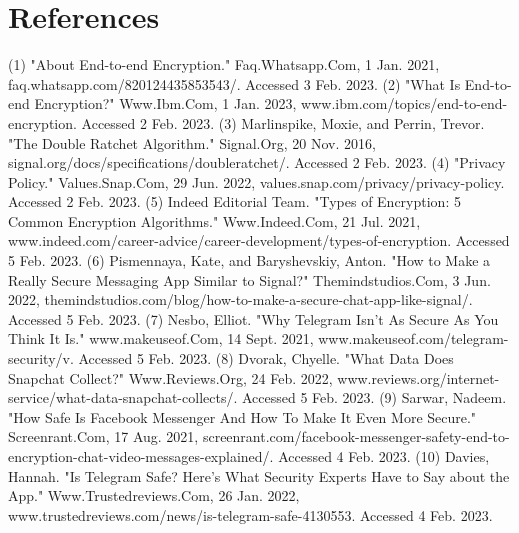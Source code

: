 \documentclass[11pt]{article}
\theoremstyle{plain}
\theoremstyle{definition}
\begin{document}
\section{References}
(1) "About End-to-end Encryption." Faq.Whatsapp.Com, 1 Jan. 2021, faq.whatsapp.com/820124435853543/. Accessed 3 Feb. 2023. \newline \newline
(2) "What Is End-to-end Encryption?" Www.Ibm.Com, 1 Jan. 2023, www.ibm.com/topics/end-to-end-encryption. Accessed 2 Feb. 2023. \newline \newline
(3) Marlinspike, Moxie, and Perrin, Trevor. "The Double Ratchet Algorithm." Signal.Org, 20 Nov. 2016, signal.org/docs/specifications/doubleratchet/. Accessed 2 Feb. 2023. \newline \newline
(4) "Privacy Policy." Values.Snap.Com, 29 Jun. 2022, values.snap.com/privacy/privacy-policy. Accessed 2 Feb. 2023. \newline \newline
(5) Indeed Editorial Team. "Types of Encryption: 5 Common Encryption Algorithms." Www.Indeed.Com, 21 Jul. 2021, www.indeed.com/career-advice/career-development/types-of-encryption. Accessed 5 Feb. 2023. \newline \newline
(6) Pismennaya, Kate, and Baryshevskiy, Anton. "How to Make a Really Secure Messaging App Similar to Signal?" Themindstudios.Com, 3 Jun. 2022, themindstudios.com/blog/how-to-make-a-secure-chat-app-like-signal/. Accessed 5 Feb. 2023. \newline \newline
(7) Nesbo, Elliot. "Why Telegram Isn't As Secure As You Think It Is." www.makeuseof.Com, 14 Sept. 2021, www.makeuseof.com/telegram-security/v. Accessed 5 Feb. 2023. \newline \newline
(8) Dvorak, Chyelle. "What Data Does Snapchat Collect?" Www.Reviews.Org, 24 Feb. 2022, www.reviews.org/internet-service/what-data-snapchat-collects/. Accessed 5 Feb. 2023. \newline \newline
(9) Sarwar, Nadeem. "How Safe Is Facebook Messenger And How To Make It Even More Secure." Screenrant.Com, 17 Aug. 2021, screenrant.com/facebook-messenger-safety-end-to-encryption-chat-video-messages-explained/. Accessed 4 Feb. 2023. \newline \newline
(10) Davies, Hannah. "Is Telegram Safe? Here’s What Security Experts Have to Say about the App." Www.Trustedreviews.Com, 26 Jan. 2022, www.trustedreviews.com/news/is-telegram-safe-4130553. Accessed 4 Feb. 2023. \newline
\end{document}
